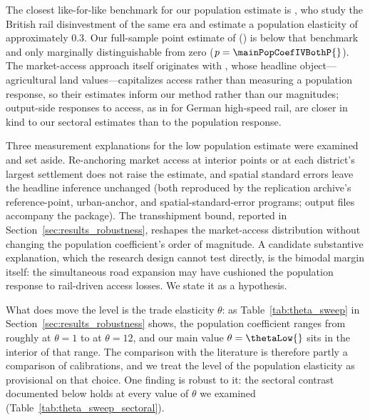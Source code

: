 The closest like-for-like benchmark for our population estimate is
\citet{gibbons2024}, who study the British rail disinvestment of the
same era and estimate a population elasticity of approximately 0.3.
Our full-sample point estimate of \mainPopCoefIVBoth{}
(\mainPopSEIVBoth{}) is below that
benchmark and only marginally distinguishable from zero
($p = \mainPopCoefIVBothP{}$). The
market-access approach itself originates with
\citet{donaldsonhornbeck2016}, whose headline object---agricultural
land values---capitalizes access rather than measuring a population
response, so their estimates inform our method rather than our
magnitudes; output-side responses to access, as in
\citet{ahlfeldtfeddersen2018} for German high-speed rail, are closer
in kind to our sectoral estimates than to the population response.

Three measurement explanations for the low population estimate were
examined and set aside. Re-anchoring market
access at interior points or at each district's largest settlement
does not raise the estimate, and spatial standard errors leave the
headline inference unchanged (both reproduced by the replication
archive's reference-point, urban-anchor, and spatial-standard-error
programs; output files accompany the package). The transshipment
bound, reported in Section~\ref{sec:results_robustness},
reshapes the market-access distribution without changing the
population coefficient's order of magnitude. A candidate substantive explanation, which the research
design cannot test directly, is the bimodal margin itself: the
simultaneous road expansion may have cushioned the population
response to rail-driven access losses. We state it as a hypothesis.

What does move the level is the trade elasticity $\theta$: as
Table~\ref{tab:theta_sweep} in Section~\ref{sec:results_robustness}
shows, the
population coefficient ranges from roughly \sweepBetaThetaOne{} at $\theta = 1$ to
\sweepBetaThetaTwelve{} at $\theta = 12$, and our main value $\theta = \thetaLow{}$ sits in
the interior of that range. The comparison with the literature is
therefore partly a comparison of calibrations, and we treat the
level of the population elasticity as provisional on that choice.
One finding is robust to it: the sectoral contrast
documented below holds at every value of $\theta$ we
examined (Table~\ref{tab:theta_sweep_sectoral}).

